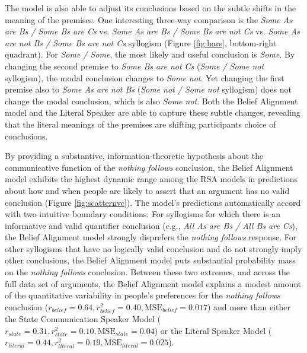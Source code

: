 \documentclass[floatsintext, man]{apa6}
\begin{document}
The model is also able to adjust its conclusions based on the subtle shifts in the meaning of the premises. One interesting three-way comparison is the \emph{Some As are Bs / Some Bs are Cs} vs. \emph{Some As are Bs / Some Bs are not Cs} vs. \emph{Some As are not Bs / Some Bs are not Cs} syllogism  (Figure \ref{fig:bars}, bottom-right quadrant).
For \emph{Some / Some}, the most likely and useful conclusion is \emph{Some}.
By changing the second premise to \emph{Some Bs are not Cs} (\emph{Some / Some not} syllogism), the modal conclusion changes to \emph{Some not}.
Yet changing the first premise also to \emph{Some As are not Bs} (\emph{Some not / Some not} syllogism) does not change the modal conclusion, which is also \emph{Some not}. 
Both the Belief Alignment model and the Literal Speaker are able to capture these subtle changes, revealing that the literal meanings of the premises are shifting participants choice of conclusions. 

By providing a substantive, information-theoretic hypothesis about the communicative function of the \emph{nothing follows} conclusion, the Belief Alignment model exhibits the highest dynamic range among the RSA models in predictions about how and when people are likely to assert that an argument has no valid conclusion (Figure \ref{fig:scatternvc}). The model's predictions automatically accord with two intuitive boundary conditions: For syllogisms for which there is an informative and valid quantifier conclusion (e.g., \emph{All As are Bs / All Bs are Cs}), the Belief Alignment model strongly disprefers the \emph{nothing follows} response.
For other syllogisms that have no logically valid conclusion and do not strongly imply other conclusions, the Belief Alignment model puts substantial probability mass on the \emph{nothing follows} conclusion.
Between these two extremes, and across the full data set of arguments, the Belief Alignment model explains a modest amount of the quantitative variability in people's preferences for the \emph{nothing follows} conclusion ($r_{belief} = 0.64, r_{belief}^2 = 0.40, \text{MSE}_{belief} = 0.017$) and more than either the State Communication Speaker Model ($r_{state} = 0.31, r_{state}^2 = 0.10, \text{MSE}_{state} = 0.04$) or the Literal Speaker Model ($r_{literal} = 0.44, r_{literal}^2 = 0.19, \text{MSE}_{literal} = 0.025$).
\end{document}
